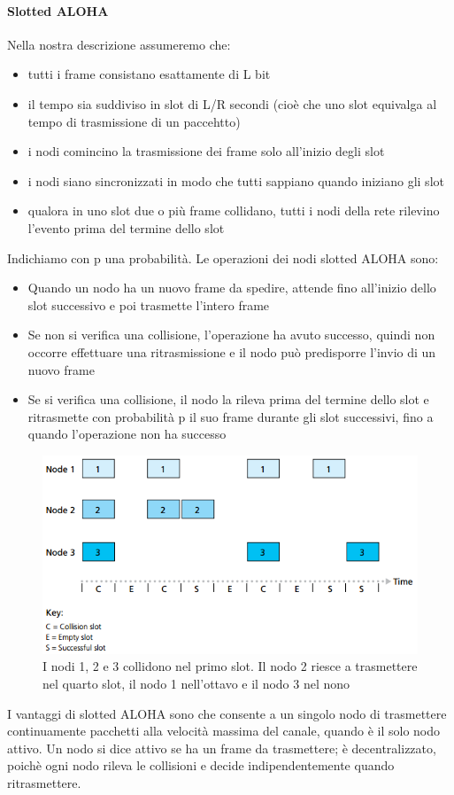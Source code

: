 \documentclass[11pt,a4paper]{book}
\begin{document}
\paragraph{Slotted ALOHA}
Nella nostra descrizione assumeremo che:
\begin{itemize}
	\item tutti i frame consistano esattamente di L bit
	\item il tempo sia suddiviso in slot di L/R secondi (cioè che uno slot equivalga al tempo di trasmissione di un paccehtto)
	\item i nodi comincino la trasmissione dei frame solo all'inizio degli slot
	\item i nodi siano sincronizzati in modo che tutti sappiano quando iniziano gli slot
	\item qualora in uno slot due o più frame collidano, tutti i nodi della rete rilevino l'evento prima del termine dello slot
\end{itemize}
Indichiamo con p una probabilità. Le operazioni dei nodi slotted ALOHA sono:
\begin{itemize}
	\item Quando un nodo ha un nuovo frame da spedire, attende fino all'inizio dello slot successivo e poi trasmette l'intero frame
	\item Se non si verifica una collisione, l'operazione ha avuto successo, quindi non occorre effettuare una ritrasmissione e il nodo può predisporre l'invio di un nuovo frame
	\item Se si verifica una collisione, il nodo la rileva prima del termine dello slot e ritrasmette con probabilità p il suo frame durante gli slot successivi, fino a quando l'operazione non ha successo
\end{itemize}
\begin{figure}
		\includegraphics[scale=0.6]{img/078.png}
		\caption{I nodi 1, 2 e 3 collidono nel primo slot. Il nodo 2 riesce a trasmettere nel quarto slot, il nodo 1 nell'ottavo e il nodo 3 nel nono}
		\label{fig: 078}
\end{figure}
I vantaggi di slotted ALOHA sono che consente a un singolo nodo di trasmettere continuamente pacchetti alla velocità massima del canale, quando è il solo nodo attivo. Un nodo si dice attivo se ha un frame da trasmettere; è decentralizzato, poichè ogni nodo rileva le collisioni e decide indipendentemente quando ritrasmettere.
\end{document}
